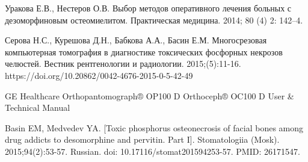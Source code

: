 \documentclass[11pt]{article}
\begin{document}
\begin{thebibliography}{3}
		    Уракова Е.В., Нестеров О.В. Выбор методов оперативного лечения больных с дезоморфиновым остеомиелитом. Практическая медицина. 2014; 80 (4) 2: 142–4.	
		
		 Серова Н.С., Курешова Д.Н., Бабкова А.А., Басин Е.М. Многосрезовая компьютерная томография в диагностике токсических фосфорных некрозов челюстей. Вестник рентгенологии и радиологии. 2015;(5):11-16. https://doi.org/10.20862/0042-4676-2015-0-5-42-49
		
		GE Healthcare Orthopantomograph® OP100 D Orthoceph® OC100 D User \& Technical Manual
		
		 Basin EM, Medvedev YA. [Toxic phosphorus osteonecrosis of facial bones among drug addicts to desomorphine and pervitin. Part I]. Stomatologiia (Mosk). 2015;94(2):53-57. Russian. doi: 10.17116/stomat201594253-57. PMID: 26171547.
			
		\end{thebibliography}
\end{document}
